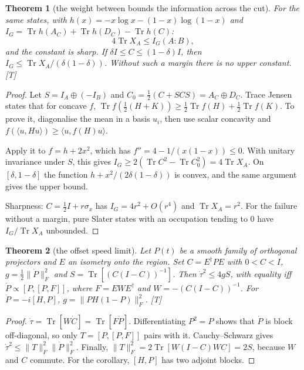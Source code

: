 \documentclass[11pt]{article}
\newtheorem{theorem}{Theorem}[section]
\theoremstyle{definition}
\newcommand{\grade}[1]{\textsf{\small[#1]}}
\newcommand{\Tr}{\operatorname{Tr}}
\begin{document}
\begin{theorem}[the weight between bounds the information across the cut]\label{thm:info}
For the same states, with $h(x)=-x\log x-(1-x)\log(1-x)$ and $I_G=\Tr h(A_C)+\Tr h(D_C)-\Tr h(C)$:
\[
4\Tr X_A\le I_G(A:B),
\]
and the constant is sharp. If $\delta I\le C\le(1-\delta)I$, then $I_G\le\Tr X_A/(\delta(1-\delta))$. Without such a margin there is no upper constant. \grade{T}
\end{theorem}
\begin{proof}
Let $S=I_A\oplus(-I_B)$ and $C_0=\tfrac12(C+SCS)=A_C\oplus D_C$. Trace Jensen states that for concave $f$, $\Tr f(\tfrac12(H+K))\ge\tfrac12\Tr f(H)+\tfrac12\Tr f(K)$. To prove it, diagonalise the mean in a basis $u_i$, then use scalar concavity and $f(\langle u,Hu\rangle)\ge\langle u,f(H)u\rangle$.

Apply it to $f=h+2x^2$, which has $f''=4-1/(x(1-x))\le0$. With unitary invariance under $S$, this gives $I_G\ge2(\Tr C^2-\Tr C_0^2)=4\Tr X_A$. On $[\delta,1-\delta]$ the function $h+x^2/(2\delta(1-\delta))$ is convex, and the same argument gives the upper bound.

Sharpness: $C=\tfrac12I+r\sigma_x$ has $I_G=4r^2+O(r^4)$ and $\Tr X_A=r^2$. For the failure without a margin, pure Slater states with an occupation tending to $0$ have $I_G/\Tr X_A$ unbounded.
\end{proof}

\begin{theorem}[the offset speed limit]\label{thm:speed}
Let $P(t)$ be a smooth family of orthogonal projectors and $E$ an isometry onto the region. Set $C=E^\dagger PE$ with $0<C<I$, $g=\tfrac12\|\dot P\|_F^2$ and $S=\Tr[(C(I-C))^{-1}]$. Then $\dot\tau^2\le4gS$, with equality iff $\dot P\propto[P,[P,F]]$, where $F=EWE^\dagger$ and $W=-(C(I-C))^{-1}$. For $\dot P=-i[H,P]$, $g=\|PH(1-P)\|_F^2$. \grade{T}
\end{theorem}
\begin{proof}
$\dot\tau=\Tr[W\dot C]=\Tr[F\dot P]$. Differentiating $P^2=P$ shows that $\dot P$ is block off-diagonal, so only $T=[P,[P,F]]$ pairs with it. Cauchy--Schwarz gives $\dot\tau^2\le\|T\|_F^2\|\dot P\|_F^2$. Finally, $\|T\|_F^2=2\Tr[W(I-C)WC]=2S$, because $W$ and $C$ commute. For the corollary, $[H,P]$ has two adjoint blocks.
\end{proof}
\end{document}
